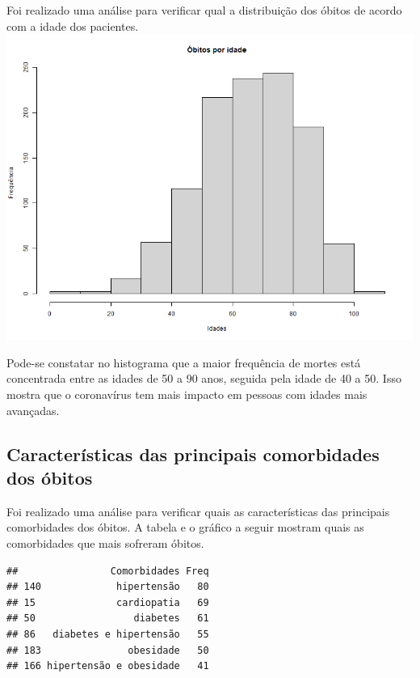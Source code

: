 \documentclass[
  brazilian,
]{article}
\begin{document}
Foi realizado uma análise para verificar qual a distribuição dos óbitos
de acordo com a idade dos pacientes.
\includegraphics{../graficos/histograma_obitos_por_idade.png}

Pode-se constatar no histograma que a maior frequência de mortes está
concentrada entre as idades de 50 a 90 anos, seguida pela idade de 40 a
50. Isso mostra que o coronavírus tem mais impacto em pessoas com idades
mais avançadas.

\hypertarget{caracteruxedsticas-das-principais-comorbidades-dos-uxf3bitos}{%
\subsection{Características das principais comorbidades dos
óbitos}\label{caracteruxedsticas-das-principais-comorbidades-dos-uxf3bitos}}

Foi realizado uma análise para verificar quais as características das
principais comorbidades dos óbitos. A tabela e o gráfico a seguir
mostram quais as comorbidades que mais sofreram óbitos.

\begin{verbatim}
##                Comorbidades Freq
## 140             hipertensão   80
## 15              cardiopatia   69
## 50                 diabetes   61
## 86   diabetes e hipertensão   55
## 183               obesidade   50
## 166 hipertensão e obesidade   41
\end{verbatim}
\end{document}
